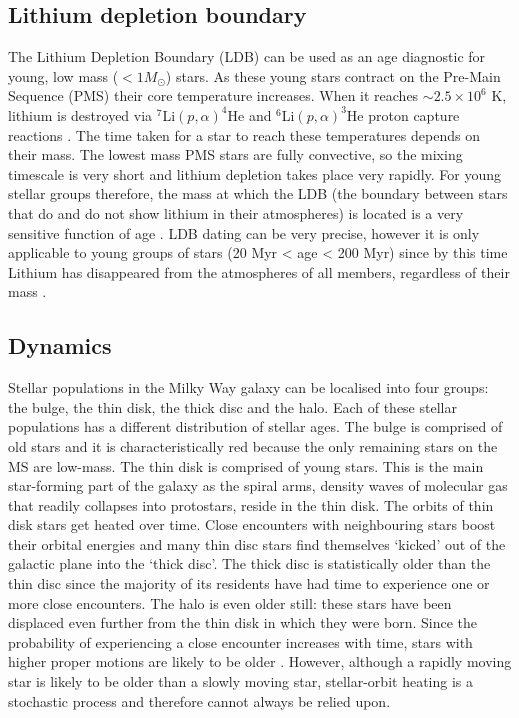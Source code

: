 \subsection{Lithium depletion boundary}
The Lithium Depletion Boundary (LDB) can be used as an age diagnostic for
young, low mass ($<1M_\odot$) stars.
As these young stars contract on the Pre-Main Sequence (PMS) their core
temperature increases.
When it reaches $\sim2.5\times10^6$ K, lithium is destroyed via $^7$Li$(p,
\alpha)^4$He and $^6$Li$(p, \alpha)^3$He proton capture reactions
\citep[\eg][]{Bodenheimer1965}.
The time taken for a star to reach these temperatures depends on their mass.
The lowest mass PMS stars are fully convective, so the mixing timescale is
very short and lithium depletion takes place very rapidly.
For young stellar groups therefore, the mass at which the LDB (the boundary
between stars that do and do not show lithium in their atmospheres) is located
is a very sensitive function of age \citep{Basri1996}.
LDB dating can be very precise, however it is only
applicable to young groups of stars (20 Myr < age < 200 Myr) since by this
time Lithium has disappeared from the atmospheres of all members, regardless
of their mass \citep{Burke2004}.

\subsection{Dynamics}
Stellar populations in the Milky Way galaxy can be localised into four groups:
the bulge, the thin disk, the thick disc and the halo.
Each of these stellar populations has a different distribution of stellar
ages.
The bulge is comprised of old stars and it is characteristically red because
the only remaining stars on the MS are low-mass.
The thin disk is comprised of young stars.
This is the main star-forming part of the galaxy as the spiral arms, density
waves of molecular gas that readily collapses into protostars, reside in the
thin disk.
The orbits of thin disk stars get heated over time.
Close encounters with neighbouring stars boost their orbital energies and many
thin disc stars find themselves `kicked' out of the galactic plane into the
`thick disc'.
The thick disc is statistically older than the thin disc since the majority of
its residents have had time to experience one or more close encounters.
The halo is even older still: these stars have been displaced even further
from the thin disk in which they were born.
Since the probability of experiencing a close encounter increases with time,
stars with higher proper motions are likely to be older \citep[see,
\eg][]{Shevelev1989, Nissen1991}.
However, although a rapidly moving star is likely to be older than a slowly
moving star, stellar-orbit heating is a stochastic process and therefore
cannot always be relied upon.

